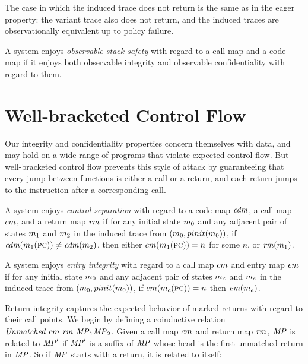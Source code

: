 \documentclass[acmsmall,review,anonymous]{acmart}\settopmatter{printfolios=true,printccs=false,printacmref=false}
\begin{document}
      The case in which the induced trace does not return is the same as in the
      eager property: the variant trace also does not return, and the induced
      traces are observationally equivalent up to policy failure.


      A system enjoys {\em observable stack safety} with regard to a call map
      and a code map if it enjoys both observable integrity and observable
      confidentiality with regard to them.

\section{Well-bracketed Control Flow}

  Our integrity and confidentiality properties concern themselves with data,
  and may hold on a wide range of programs that violate expected control flow.
  But well-bracketed control flow prevents this style of attack by guaranteeing
  that every jump between functions is either a call or a return, and each
  return jumps to the instruction after a corresponding call.


    A system enjoys {\em control separation} with regard to a code map
    \(\mathit{cdm}\), a call map \(cm\), and a return map \(\mathit{rm}\)
    if for any initial state \(m_0\) and any adjacent pair of states
    \(m_1\) and \(m_2\) in the induced trace from
    \((m_0,pinit(m_0))\), if \(\mathit{cdm}(m_1(\textsc{pc}))
    \not = \mathit{cdm}(m_2)\), then either \(cm(m_1(\textsc{pc})) = n\)
    for some \(n\), or \(\mathit{rm}(m_1)\).


    A system enjoys {\em entry integrity} with regard to a call map
    \(cm\) and entry map \(\mathit{em}\) if for any initial state
    \(m_0\) and any adjacent pair of states \(m_c\) and \(m_e\)
    in the induced trace from \((m_0,pinit(m_0))\), if
    \(cm(m_c(\textsc{pc})) = n\) then \(\mathit{em}(m_e)\).


    Return integrity captures the expected behavior of marked returns with
    regard to their call points. We begin by defining a coinductive relation
    \(\mathit{Unmatched}\ \callmap\ \retmap\ \MPT_1 \MPT_2\). Given a call map
    \(cm\) and return map \(\mathit{rm}\), \(\mathit{MP}\) is related to
    \(\mathit{MP}'\) if \(\mathit{MP}'\) is a suffix of \(\mathit{MP}\) whose head is the first
    unmatched return in \(\mathit{MP}\). So if \(\mathit{MP}\) starts with a return,
    it is related to itself:
\end{document}
